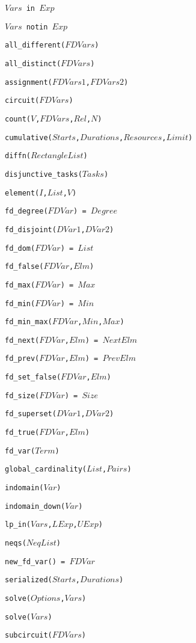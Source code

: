 \item {\tt $Vars$ in $Exp$}
\item {\tt $Vars$ notin $Exp$}
\item {\tt all\_different($FDVars$)}
\item {\tt all\_distinct($FDVars$)}
\item {\tt assignment($FDVars1$,$FDVars2$)}
\item {\tt circuit($FDVars$)}
\item {\tt count($V$,$FDVars$,$Rel$,$N$)}
\item {\tt cumulative($Starts$,$Durations$,$Resources$,$Limit$)}
\item {\tt diffn($RectangleList$)}
\item {\tt disjunctive\_tasks($Tasks$)}
\item {\tt element($I$,$List$,$V$)}
\item {\tt fd\_degree($FDVar$) = $Degree$}
\item {\tt fd\_disjoint($DVar1$,$DVar2$)}
\item {\tt fd\_dom($FDVar$) = $List$}
\item {\tt fd\_false($FDVar$,$Elm$)}
\item {\tt fd\_max($FDVar$) = $Max$}
\item {\tt fd\_min($FDVar$) = $Min$}
\item {\tt fd\_min\_max($FDVar$,$Min$,$Max$)}
\item {\tt fd\_next($FDVar$,$Elm$) = $NextElm$}
\item {\tt fd\_prev($FDVar$,$Elm$) = $PrevElm$}
\item {\tt fd\_set\_false($FDVar$,$Elm$)}
\item {\tt fd\_size($FDVar$) = $Size$}
\item {\tt fd\_superset($DVar1$,$DVar2$)}
\item {\tt fd\_true($FDVar$,$Elm$)}
\item {\tt fd\_var($Term$)}
\item {\tt global\_cardinality($List$,$Pairs$)}
\item {\tt indomain($Var$)}
\item {\tt indomain\_down($Var$)}
\item {\tt lp\_in($Vars$,$LExp$,$UExp$)}
\item {\tt neqs($NeqList$)}
\item {\tt new\_fd\_var() = $FDVar$}
\item {\tt serialized($Starts$,$Durations$)}
\item {\tt solve($Options$,$Vars$)}
\item {\tt solve($Vars$)}
\item {\tt subcircuit($FDVars$)}

